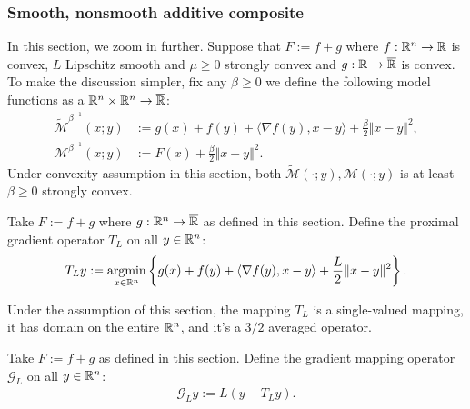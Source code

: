 \documentclass[12pt]{article}
\begin{document}
        \subsubsection{Smooth, nonsmooth additive composite}\label{sssec:additive-composite}
            In this section, we zoom in further. 
            Suppose that $F:= f + g$ where $f:\mathbb R^n \rightarrow \mathbb R$ is convex, $L$ Lipschitz smooth and $\mu \ge 0$ strongly convex and $g: \mathbb R\rightarrow \overline {\mathbb R}$ is convex. 
            To make the discussion simpler, fix any $\beta \ge 0$ we define the following model functions as a $\mathbb R^n \times \mathbb R^n \rightarrow \overline {\mathbb R}$: 
            \begin{align*}
                \widetilde{\mathcal M}^{\beta^{-1}}
                (x; y)
                &:= 
                g(x) + f(y) + \langle \nabla f(y), x - y\rangle
                + \frac{\beta}{2}\Vert x - y\Vert^2,
                \\
                \mathcal M^{\beta^{-1}}(x; y) 
                &:= F(x) + \frac{\beta}{2}\Vert x - y\Vert^2.
            \end{align*}
            Under convexity assumption in this section, both $\widetilde {\mathcal M} (\cdot; y),  {\mathcal M}(\cdot;y )$ is at least $\beta \ge 0$ strongly convex. 
            \begin{definition}\label{def:proximal-gradient-operator}
                Take $F := f + g$ where $g: \mathbb R^n \rightarrow \overline {\mathbb R}$ as defined in this section. 
                Define the proximal gradient operator $T_L$ on all $y \in \mathbb R^n$: 
                \begin{align*}
                    T_L y := \mathop{\rm argmin}\limits_{x \in \mathbb R^n} \left\lbrace
                        g(x) + f(y) + \langle \nabla f(y), x - y\rangle 
                        + \frac{L}{2}\Vert x- y \Vert^2
                    \right\rbrace. 
                \end{align*}
            \end{definition}
            \begin{remark}
                Under the assumption of this section, the mapping $T_L$ is a single-valued mapping, it has domain on the entire $\mathbb R^n$, and it's a $3/2$ averaged operator. 
            \end{remark}
            \begin{definition}\label{def:gradient-mapping-operator}
                Take $F := f + g$ as defined in this section. 
                Define the gradient mapping operator $\mathcal G_L$ on all $y \in \mathbb R^n$: 
                \begin{align*}
                    \mathcal G_L y:= L(y - T_L y). 
                \end{align*}
            \end{definition}
\end{document}
